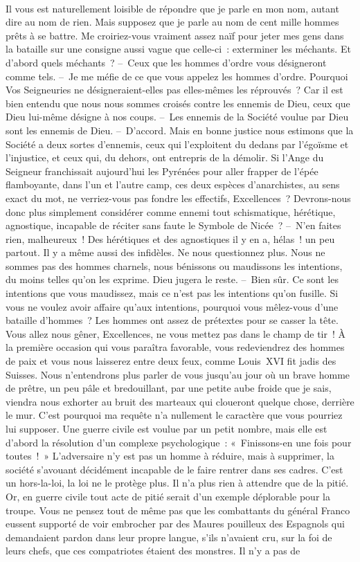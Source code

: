 \documentclass[french,twoside]{book} %
\begin{document}
\noindent  \par
Il vous est naturellement loisible de répondre que je parle en mon nom, autant dire au nom de rien. Mais supposez que je parle au nom de cent mille hommes prêts à se battre. Me croiriez-vous vraiment assez naïf pour jeter mes gens dans la bataille sur une consigne aussi vague que celle-ci : exterminer les méchants. Et d’abord quels méchants ? – Ceux que les hommes d’ordre vous désigneront comme tels. – Je me méfie de ce que vous appelez les hommes d’ordre. Pourquoi Vos Seigneuries ne désigneraient-elles pas elles-mêmes les réprouvés ? Car il est bien entendu que nous nous sommes croisés contre les ennemis de Dieu, ceux que Dieu lui-même désigne à nos coups. – Les ennemis de la Société voulue par Dieu sont les ennemis de Dieu. – D’accord. Mais en bonne justice nous estimons que la Société a deux sortes d’ennemis, ceux qui l’exploitent du dedans par l’égoïsme et l’injustice, et ceux qui, du dehors, ont entrepris de la démolir. Si l’Ange du Seigneur franchissait aujourd’hui les Pyrénées pour aller frapper de l’épée flamboyante, dans l’un et l’autre camp, ces deux espèces d’anarchistes, au sens exact du mot, ne verriez-vous pas fondre les effectifs, Excellences ? Devrons-nous donc plus simplement considérer comme ennemi tout schismatique, hérétique, agnostique, incapable de réciter sans faute le Symbole de Nicée ? – N’en faites rien, malheureux ! Des hérétiques et des agnostiques il y en a, hélas ! un peu partout. Il y a même aussi des infidèles. Ne nous questionnez plus. Nous ne sommes pas des hommes charnels, nous bénissons ou maudissons les intentions, du moins telles qu’on les exprime. Dieu jugera le reste. – Bien sûr. Ce sont les intentions que vous maudissez, mais ce n’est pas les intentions qu’on fusille. Si vous ne voulez avoir affaire qu’aux intentions, pourquoi vous mêlez-vous d’une bataille d’hommes ? Les hommes ont assez de prétextes pour se casser la tête. Vous allez nous gêner, Excellences, ne vous mettez pas dans le champ de tir ! À la première occasion qui vous paraîtra favorable, vous redeviendrez des hommes de paix et vous nous laisserez entre deux feux, comme Louis \textsc{XVI} fit jadis des Suisses. Nous n’entendrons plus parler de vous jusqu’au jour où un brave homme de prêtre, un peu pâle et bredouillant, par une petite aube froide que je sais, viendra nous exhorter au bruit des marteaux qui cloueront quelque chose, derrière le mur. C’est pourquoi ma requête n’a nullement le caractère que vous pourriez lui supposer. Une guerre civile est voulue par un petit nombre, mais elle est d’abord la résolution d’un complexe psychologique : « Finissons-en une fois pour toutes ! » L’adversaire n’y est pas un homme à réduire, mais à supprimer, la société s’avouant décidément incapable de le faire rentrer dans ses cadres. C’est un hors-la-loi, la loi ne le protège plus. Il n’a plus rien à attendre que de la pitié. Or, en guerre civile tout acte de pitié serait d’un exemple déplorable pour la troupe. Vous ne pensez tout de même pas que les combattants du général Franco eussent supporté de voir embrocher par des Maures pouilleux des Espagnols qui demandaient pardon dans leur propre langue, s’ils n’avaient cru, sur la foi de leurs chefs, que ces compatriotes étaient des monstres. Il n’y a pas de 
\end{document}
